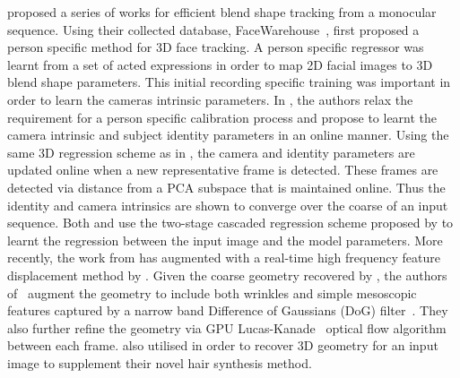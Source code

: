  proposed a series of works for efficient blend shape
tracking from a monocular sequence. Using their collected database,
FaceWarehouse~\cite{Cao:2014gy}, \citet{Cao:2013cd} first proposed a person
specific method for 3D face tracking. A person specific regressor was learnt
from a set of acted expressions in order to map 2D facial images to 3D blend
shape parameters. This initial recording specific training was important in
order to learn the cameras intrinsic parameters. In \citet{Cao:2014bi}, the
authors relax the requirement for a person specific calibration process and
propose to learnt the camera intrinsic and subject identity parameters in an
online manner. Using the same 3D regression scheme as in
\citet{Cao:2013cd}, the camera and identity parameters are updated online when
a new representative frame is detected. These frames are detected via distance
from a PCA subspace that is maintained online. Thus the identity and camera
intrinsics are shown to converge over the coarse of an input sequence. Both
\citet{Cao:2013cd} and \citet{Cao:2014bi} use the two-stage cascaded regression
scheme proposed by \citet{cao2014face} to learnt the regression between the
input image and the model parameters. More recently, the work from
\citet{Cao:2014bi} has augmented with a real-time high frequency feature
displacement method by \citet{Cao:2015gy}. Given the coarse geometry recovered
by \citet{Cao:2014bi}, the authors of~\cite{Cao:2015gy} augment the geometry
to include both wrinkles and simple mesoscopic features captured by a narrow
band Difference of Gaussians (DoG) filter~\cite{Beeler:2010dg}. They also
further refine the geometry via GPU Lucas-Kanade~\cite{lucas1981iterative}
optical flow algorithm between each frame. \citet{Chai:2015dq} also
utilised \citet{Cao:2014bi} in order to recover 3D geometry for an input image
to supplement their novel hair synthesis method.

